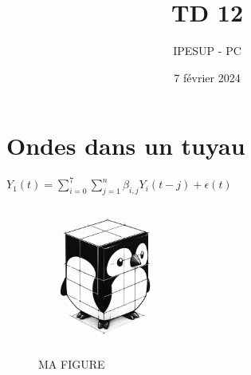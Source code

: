 \documentclass{article}
\title{TD 12 }
\author{IPESUP - PC }
\date{7 février 2024}
\begin{document}
\maketitle



\section{Ondes dans un tuyau}

$Y_1(t) = \sum_{i=0}^{7} \sum_{j=1}^{n}  \beta_{i,j} Y_i(t-j) + \epsilon(t)$


\begin{figure}[h]
  \centering
  \includegraphics[width=0.4\textwidth]{pingouin_schema.jpeg}
  \label{fig:maison}
    \caption{MA FIGURE}
\end{figure}
\end{document}
